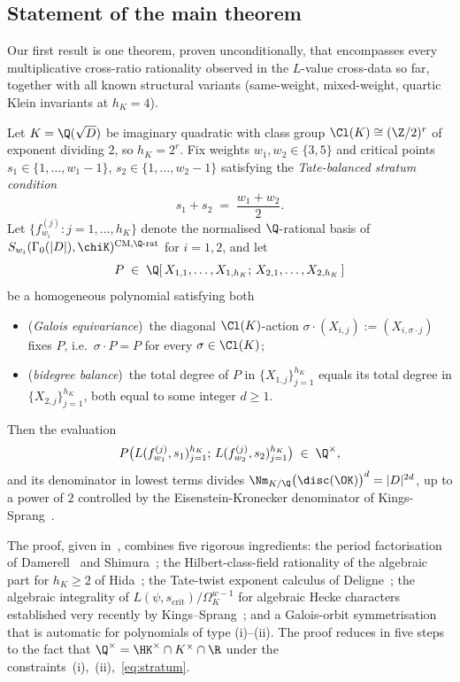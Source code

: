 \subsection{Statement of the main theorem}\label{ss:T1-statement}
Our first result is one theorem, proven unconditionally, that
encompasses every multiplicative cross-ratio rationality
observed in the $L$-value cross-data so far, together with all
known structural variants (same-weight, mixed-weight, quartic
Klein invariants at $h_K = 4$).

\begin{theorem}\label{thm:T1}
Let $K = \Q(\sqrt{D})$ be imaginary quadratic with class group
$\Cl(K) \cong (\Z/2)^r$ of exponent dividing $2$, so $h_K = 2^r$.
Fix weights $w_1, w_2 \in \{3, 5\}$ and critical points $s_1 \in
\{1, \dots, w_1 - 1\}$, $s_2 \in \{1, \dots, w_2 - 1\}$ satisfying
the \emph{Tate-balanced stratum condition}
\begin{equation}\label{eq:stratum}
s_1 + s_2 \;=\; \frac{w_1 + w_2}{2}.
\end{equation}
Let $\{f_{w_i}^{(j)} : j = 1, \dots, h_K\}$ denote the normalised
$\Q$-rational basis of $S_{w_i}(\Gamma_0(|D|), \chiK)^{\mathrm{CM},\Q\text{-rat}}$
for $i = 1, 2$, and let
\[
P \;\in\; \Q[\,X_{1,1}, \dots, X_{1,h_K};\,
                 X_{2,1}, \dots, X_{2,h_K}\,]
\]
be a homogeneous polynomial satisfying both
\begin{itemize}
\item[\textup{(i)}] (\emph{Galois equivariance})~the diagonal
$\Cl(K)$-action $\sigma \cdot (X_{i,j}) := (X_{i,\sigma \cdot j})$
fixes $P$, i.e.\ $\sigma \cdot P = P$ for every $\sigma \in \Cl(K)$;
\item[\textup{(ii)}] (\emph{bidegree balance})~the total degree of
$P$ in $\{X_{1,j}\}_{j=1}^{h_K}$ equals its total degree in
$\{X_{2,j}\}_{j=1}^{h_K}$, both equal to some integer $d \geq 1$.
\end{itemize}
Then the evaluation
\begin{equation}\label{eq:T1-conclusion}
P\bigl(L(f_{w_1}^{(j)}, s_1)_{j=1}^{h_K};\,
       L(f_{w_2}^{(j)}, s_2)_{j=1}^{h_K}\bigr) \;\in\; \Q^\times,
\end{equation}
and its denominator in lowest terms divides
$\Nm_{K/\Q}\bigl(\disc(\OK)\bigr)^{d} = |D|^{2d}$, up to a power
of $2$ controlled by the Eisenstein-Kronecker denominator of
Kings-Sprang~\cite{KingsSprang2025}.
\end{theorem}

The proof, given in~, combines five rigorous
ingredients: the period factorisation of
Damerell~\cite{Damerell1971} and Shimura~\cite{Shimura1976};
the Hilbert-class-field rationality of the algebraic part for
$h_K \geq 2$ of Hida~\cite{Hida1981}; the Tate-twist exponent
calculus of Deligne~\cite{Deligne1979}; the algebraic
integrality of $L(\psi, s_{\mathrm{crit}})/\Omega_K^{w-1}$ for
algebraic Hecke characters established very recently by
Kings--Sprang~\cite{KingsSprang2025}; and a Galois-orbit
symmetrisation that is automatic for polynomials of type
(i)--(ii). The proof reduces in five steps to the fact that
$\Q^\times = \HK^\times \cap K^\times \cap \R$ under the
constraints~(i),~(ii),~\eqref{eq:stratum}.

